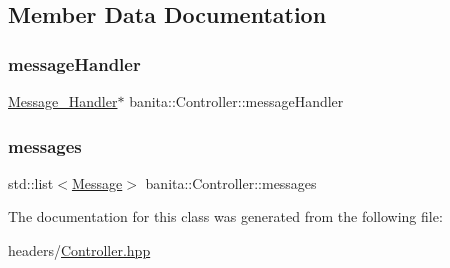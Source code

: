 \subsection{Member Data Documentation}
\mbox{\label{classbanita_1_1_controller_aa92dd1db0f265962029842ee6495c2cc}} 
\subsubsection{\texorpdfstring{messageHandler}{messageHandler}}
{\footnotesize\ttfamily \mbox{\hyperlink{classbanita_1_1_message___handler}{Message\+\_\+\+Handler}}$\ast$ banita\+::\+Controller\+::message\+Handler\hspace{0.3cm}{\ttfamily [protected]}}

\mbox{\label{classbanita_1_1_controller_ab4ca85fe5f2645708b89934f394ad449}} 
\subsubsection{\texorpdfstring{messages}{messages}}
{\footnotesize\ttfamily std\+::list$<$\mbox{\hyperlink{classbanita_1_1_message}{Message}}$>$ banita\+::\+Controller\+::messages\hspace{0.3cm}{\ttfamily [protected]}}



The documentation for this class was generated from the following file\+:\begin{DoxyCompactItemize}
\item 
headers/\mbox{\hyperlink{_controller_8hpp}{Controller.\+hpp}}\end{DoxyCompactItemize}
